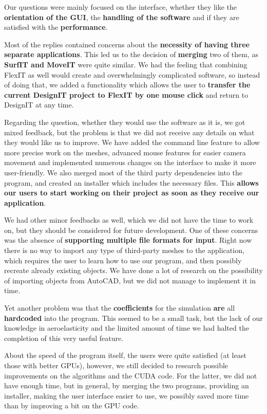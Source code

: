 \documentclass[a4paper, 11pt, article]{report}
\begin{document}
Our questions were mainly focused on the interface, whether they like the \textbf{orientation of the GUI}, the \textbf{handling of the software} and if they are satisfied with the \textbf{performance}.

Most of the replies contained concerns about the \textbf{necessity of having three separate applications}. This led us to the decision of \textbf{merging} two of them, as \textbf{SurfIT and MoveIT} were quite similar. We had the feeling that combining FlexIT as well would create and overwhelmingly complicated software, so instead of doing that, we added a functionality which allows the user to \textbf{transfer the current DesignIT project to FlexIT by one mouse click} and return to DesignIT at any time.

Regarding the question, whether they would use the software as it is, we got mixed feedback, but the problem is that we did not receive any details on what they would like us to improve. We have added the command line feature to allow more precise work on the meshes, advanced mouse features for easier camera movement and implemented numerous changes on the interface to make it more user-friendly. We also merged most of the third party dependencies into the program, and created an installer which includes the necessary files. This \textbf{allows our users to start working on their project as soon as they receive our application}.

We had other minor feedbacks as well, which we did not have the time to work on, but they should be considered for future development. One of these concerns was the absence of \textbf{supporting multiple file formats for input}. Right now there is no way to import any type of third-party meshes to the application, which requires the user to learn how to use our program, and then possibly recreate already existing objects. We have done a lot of research on the possibility of importing objects from AutoCAD, but we did not manage to implement it in time.

Yet another problem was that the \textbf{coefficients} for the simulation \textbf{are} all \textbf{hardcoded} into the program. This seemed to be a small task, but the lack of our knowledge in aeroelasticity and the limited amount of time we had halted the completion of this very useful feature.

About the speed of the program itself, the users were quite satisfied (at least those with better GPUs), however, we still decided to research possible improvements on the algorithms and the CUDA code. For the latter, we did not have enough time, but in general, by merging the two programs, providing an installer, making the user interface easier to use, we possibly saved more time than by improving a bit on the GPU code.
\end{document}
